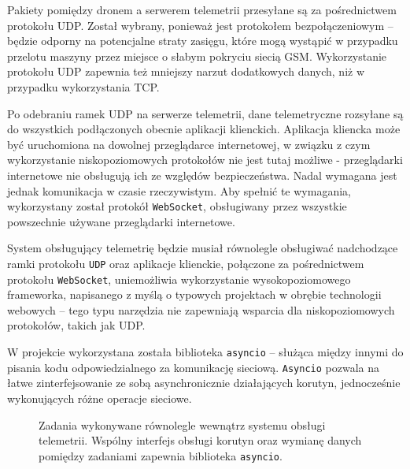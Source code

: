 Pakiety pomiędzy dronem a serwerem telemetrii przesyłane są za pośrednictwem protokołu
UDP. Został wybrany, ponieważ jest protokołem bezpołączeniowym -- będzie odporny na
potencjalne straty zasięgu, które mogą wystąpić w przypadku
przelotu maszyny przez miejsce o słabym pokryciu siecią GSM. Wykorzystanie protokołu
UDP zapewnia też mniejszy narzut dodatkowych danych, niż w przypadku wykorzystania
TCP.

Po odebraniu ramek UDP na serwerze telemetrii, dane telemetryczne rozsyłane są do
wszystkich podłączonych obecnie aplikacji klienckich. Aplikacja kliencka może
być uruchomiona na dowolnej przeglądarce internetowej, w związku z czym wykorzystanie
niskopoziomowych protokołów nie jest tutaj możliwe - przeglądarki internetowe nie 
obsługują ich ze względów bezpieczeństwa. Nadal wymagana jest jednak komunikacja
w czasie rzeczywistym. 
Aby spełnić te wymagania, wykorzystany został protokół \texttt{WebSocket}\cite{websocket},
obsługiwany przez wszystkie powszechnie używane przeglądarki internetowe.

System obsługujący telemetrię będzie musiał równolegle obsługiwać nadchodzące
ramki protokołu \texttt{UDP} oraz aplikacje klienckie, połączone za pośrednictwem protokołu 
\texttt{WebSocket}, uniemożliwia wykorzystanie wysokopoziomowego frameworka,
napisanego z myślą o typowych projektach w obrębie technologii webowych --
tego typu narzędzia nie zapewniają wsparcia dla niskopoziomowych protokołów,
takich jak UDP.

W projekcie wykorzystana została biblioteka \texttt{asyncio} -- służąca między innymi
do pisania kodu odpowiedzialnego za komunikację sieciową\cite{asyncio}.
\texttt{Asyncio} pozwala na łatwe zinterfejsowanie ze sobą asynchronicznie działających
korutyn, jednocześnie wykonujących różne operacje sieciowe. 

\begin{figure}[H]
	\centering\small
	\caption{
		Zadania wykonywane równolegle wewnątrz systemu obsługi telemetrii.
		Wspólny interfejs obsługi korutyn oraz wymianę danych pomiędzy
		zadaniami zapewnia biblioteka \texttt{asyncio}.	
	}
	\label{fig}


\begin{center}
\end{center}
\end{figure}

